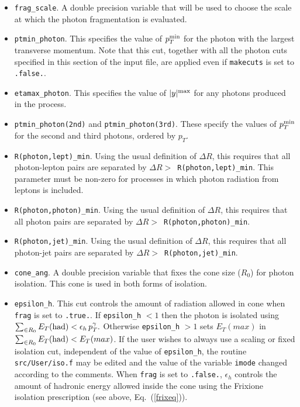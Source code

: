\documentclass[12pt]{article}
\begin{document}
\begin{itemize}
\item {\tt frag\_scale}. A double precision variable that will be used to choose the scale 
at which the photon fragmentation is evaluated. 

\item {\tt ptmin\_photon}. This specifies the value
of $p_T^{\rm min}$ for the photon with the largest transverse momentum.
Note that this cut, together with all the photon cuts specified in this section
of the input file, are applied even if {\tt makecuts} is set to {\tt .false.}.

\item {\tt etamax\_photon}. This specifies the value
of $|y|^{\rm max}$ for any photons produced in the process.

\item {\tt ptmin\_photon(2nd)} and {\tt ptmin\_photon(3rd)}. These specify the values
of $p_T^{\rm min}$ for the second and third photons, ordered by $p_T$.

\item {\tt R(photon,lept)\_min}. Using the usual definition of $\Delta R$,
this requires that all photon-lepton pairs are separated by
$\Delta R >$~{\tt R(photon,lept)\_min}. This parameter must be non-zero
for processes in which photon radiation from leptons is included.

\item {\tt R(photon,photon)\_min}. Using the usual definition of $\Delta R$,
this requires that all photon pairs are separated by
$\Delta R >$~{\tt R(photon,photon)\_min}.

\item {\tt R(photon,jet)\_min}. Using the usual definition of $\Delta R$,
this requires that all photon-jet pairs are separated by
$\Delta R >$~{\tt R(photon,jet)\_min}.

\item {\tt cone\_ang}. A double precision variable that fixes the cone size ($R_0$) for photon isolation.
This cone is used in both forms of isolation. 

\item {\tt epsilon\_h}. This cut controls the amount of radiation allowed in cone when  {\tt frag} is set to {\tt .true.}. If  {\tt epsilon\_h} $ < 1$ then the photon is isolated using
$\sum_{\in R_0} E_T{\rm{(had)}} < \epsilon_h \, p^{\gamma}_{T}.$ Otherwise {\tt epsilon\_h}  $ > 1$ sets $E_T(max)$ in  $\sum_{\in R_0} E_T{\rm{(had)}} < E_T(max)$.  
If the user wishes to always use a scaling or fixed isolation cut, independent of the value of {\tt epsilon\_h}, the routine
{\tt src/User/iso.f} may be edited and the value of the variable {\tt imode} changed according to the comments.
When {\tt frag} is set to {\tt .false.}, $\epsilon_h$ controls the amount of hadronic energy allowed inside the cone using the
Frixione isolation prescription (see above, Eq.~(\ref{frixeq})). 


\end{itemize}
\end{document}
